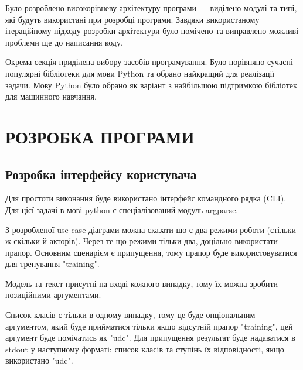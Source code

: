 \documentclass[14pt]{extarticle}
\let\oldsection\section
\renewcommand{\section}{\clearpage\oldsection}
\begin{document}
  Було розроблено високорівневу архітектуру програми ---
  виділено модулі та типі, які будуть використані при розробці програми.
  Завдяки використаному ітераційному підходу розробки
  архітектури було помічено та виправлено можливі проблеми ще до написання коду.

  Окрема секція приділена вибору засобів програмування.
  Було порівняно сучасні популярні бібліотеки для мови Python
  та обрано найкращий для реалізації задачи.
  Мову Python було обрано як варіант з найбільшою підтримкою бібліотек
  для машинного навчання.

  \section{РОЗРОБКА ПРОГРАМИ}
  \subsection{Розробка інтерфейсу користувача}
  Для простоти виконання буде використано інтерфейс командного рядка (CLI). 
  Для цієї задачі в мові python є спеціалізований модуль argparse.

  З розробленої use-case діаграми можна сказати шо є два режими роботи
  (стільки  ж скільки й акторів).
  Через те що режими тільки два, доцільно використати прапор.
  Основним сценарієм є припущення,
  тому прапор буде використовуватися для тренування "\-\-training".
  
  Модель та текст присутні на вході кожного випадку,
  тому їх можна зробити позиційними аргументами.
  
  Список класів є тільки в одному випадку,
  тому це буде опціональним аргументом,
  який буде прийматися тільки якщо відсутній прапор "\-\-training",
  цей аргумент буде помічатись як "\-\-udc".
  Для припущення результат буде надаватися в stdout у наступному форматі:
  список класів та ступінь їх відповідності, якщо використано "\-\-udc".
  
\end{document}
